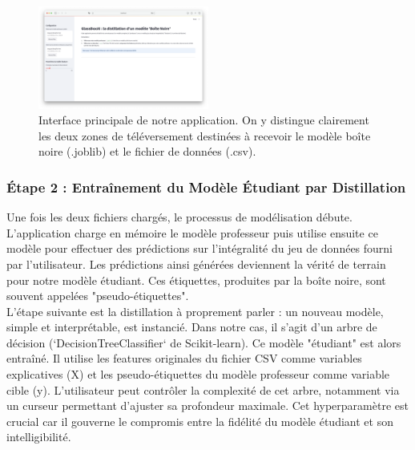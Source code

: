 \documentclass{article}
\begin{document}
    \begin{figure}[h]
        \centering
        \includegraphics[width=0.5\textwidth]{app_start.png}
        \caption{Interface principale de notre application. On y distingue clairement les deux zones de téléversement destinées à recevoir le modèle boîte noire (.joblib) et le fichier de données (.csv).}
        \label{fig:upload_interface}
    \end{figure}

    \subsubsection{Étape 2 : Entraînement du Modèle Étudiant par Distillation}
    
    \quad Une fois les deux fichiers chargés, le processus de modélisation débute. L'application charge en mémoire le modèle professeur puis utilise ensuite ce modèle pour effectuer des prédictions sur l'intégralité du jeu de données fourni par l'utilisateur. Les prédictions ainsi générées deviennent la vérité de terrain pour notre modèle étudiant. Ces étiquettes, produites par la boîte noire, sont souvent appelées "pseudo-étiquettes".\\
    
    L'étape suivante est la distillation à proprement parler : un nouveau modèle, simple et interprétable, est instancié. Dans notre cas, il s'agit d'un arbre de décision (`DecisionTreeClassifier` de Scikit-learn). Ce modèle "étudiant" est alors entraîné. Il utilise les features originales du fichier CSV comme variables explicatives (X) et les pseudo-étiquettes du modèle professeur comme variable cible (y). L'utilisateur peut contrôler la complexité de cet arbre, notamment via un curseur permettant d'ajuster sa profondeur maximale. Cet hyperparamètre est crucial car il gouverne le compromis entre la fidélité du modèle étudiant et son intelligibilité.
    
\end{document}
